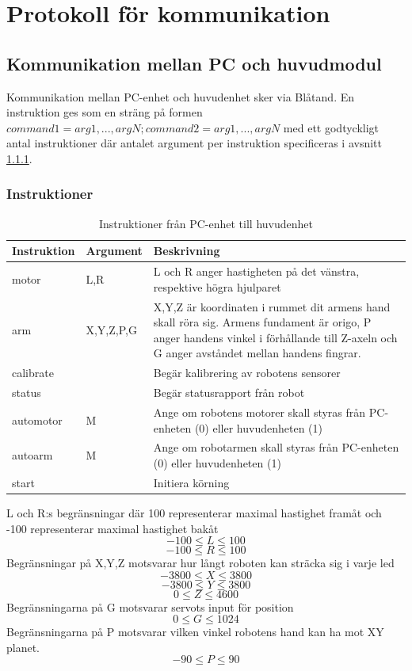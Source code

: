 \section{Protokoll för kommunikation}

\subsection{Kommunikation mellan PC och huvudmodul}\label{designspec:protokoll}

Kommunikation mellan PC-enhet och huvudenhet sker via Blåtand. En instruktion ges som en sträng på formen $command1=arg1,...,argN;command2=arg1,...,argN$ med ett godtyckligt antal instruktioner där antalet argument per instruktion specificeras i avsnitt \ref{designspec:protokoll-pc-huvud-kommandon}.

\subsubsection{Instruktioner} \label{designspec:protokoll-pc-huvud-kommandon}

\begin{table}[h]
	\centering
		\begin{tabularx}{\textwidth}{| l | l | X |}
			\hline
			\textbf{Instruktion} & \textbf{Argument} & \textbf{Beskrivning} \\
			\hline
			{motor} & {L,R} & {L och R anger hastigheten på det vänstra, respektive högra hjulparet} \\
			\hline
			{arm} & {X,Y,Z,P,G} & {X,Y,Z är koordinaten i rummet dit armens hand skall röra sig. Armens fundament är origo, P anger handens vinkel i förhållande till Z-axeln och G anger avståndet mellan handens fingrar.} \\
			\hline
			{calibrate} & {} & {Begär kalibrering av robotens sensorer} \\
			\hline
			{status} & {} & {Begär statusrapport från robot} \\
			\hline
			{automotor} & {M} & {Ange om robotens motorer skall styras från PC-enheten (0) eller huvudenheten (1)} \\
			\hline
			{autoarm} & {M} & {Ange om robotarmen skall styras från PC-enheten (0) eller huvudenheten (1)} \\
			\hline
			{start} & {} & {Initiera körning} \\
			\hline
		\end{tabularx}
	\caption{Instruktioner från PC-enhet till huvudenhet} \label{protokoll:pc-huvud}
\end{table}
L och R:s begränsningar där 100 representerar maximal hastighet framåt och -100 representerar maximal hastighet bakåt
$$-100\leq L \leq 100$$
$$-100\leq R \leq 100$$
Begränsningar på X,Y,Z motsvarar hur långt roboten kan sträcka sig i varje led
$$-3800\leq X \leq 3800$$
$$-3800\leq Y \leq 3800$$
$$0\leq Z \leq 4600$$
Begränsningarna på G motsvarar servots input för position
$$0\leq G \leq 1024$$
Begränsningarna på P motsvarar vilken vinkel robotens hand kan ha mot XY planet.
$$-90\leq P \leq 90$$

